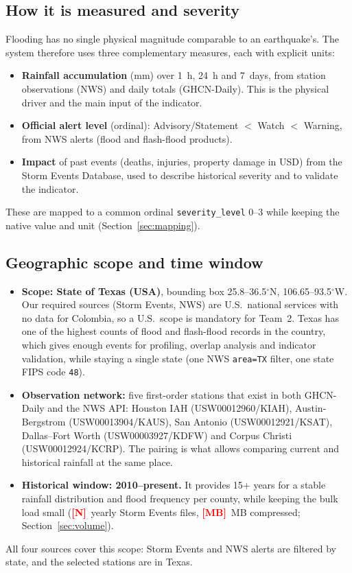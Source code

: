 \documentclass[11pt,letterpaper]{article}
\newcommand{\fillin}[1]{\textcolor{red}{\textbf{[#1]}}}
\newcommand{\StormFiles}{\fillin{N}}       \newcommand{\StormMB}{\fillin{MB}}
\begin{document}
\subsection{How it is measured and severity}
Flooding has no single physical magnitude comparable to an earthquake's. The system therefore uses three complementary measures, each with explicit units:
\begin{itemize}
  \item \textbf{Rainfall accumulation} (mm) over 1~h, 24~h and 7~days, from station observations (NWS) and daily totals (GHCN-Daily). This is the physical driver and the main input of the indicator.
  \item \textbf{Official alert level} (ordinal): Advisory/Statement $<$ Watch $<$ Warning, from NWS alerts (flood and flash-flood products).
  \item \textbf{Impact} of past events (deaths, injuries, property damage in USD) from the Storm Events Database, used to describe historical severity and to validate the indicator.
\end{itemize}
These are mapped to a common ordinal \texttt{severity\_level} 0--3 while keeping the native value and unit (Section~\ref{sec:mapping}).

\subsection{Geographic scope and time window}
\begin{itemize}
  \item \textbf{Scope: State of Texas (USA)}, bounding box 25.8--36.5$^\circ$N, 106.65--93.5$^\circ$W. Our required sources (Storm Events, NWS) are U.S.\ national services with no data for Colombia, so a U.S.\ scope is mandatory for Team~2. Texas has one of the highest counts of flood and flash-flood records in the country, which gives enough events for profiling, overlap analysis and indicator validation, while staying a single state (one NWS \texttt{area=TX} filter, one state FIPS code \texttt{48}).
  \item \textbf{Observation network:} five first-order stations that exist in both GHCN-Daily and the NWS API: Houston IAH (USW00012960/KIAH), Austin-Bergstrom (USW00013904/KAUS), San Antonio (USW00012921/KSAT), Dallas--Fort Worth (USW00003927/KDFW) and Corpus Christi (USW00012924/KCRP). The pairing is what allows comparing current and historical rainfall at the same place.
  \item \textbf{Historical window: 2010--present.} It provides 15+ years for a stable rainfall distribution and flood frequency per county, while keeping the bulk load small (\StormFiles\ yearly Storm Events files, \StormMB~MB compressed; Section~\ref{sec:volume}).
\end{itemize}
All four sources cover this scope: Storm Events and NWS alerts are filtered by state, and the selected stations are in Texas.
\end{document}
